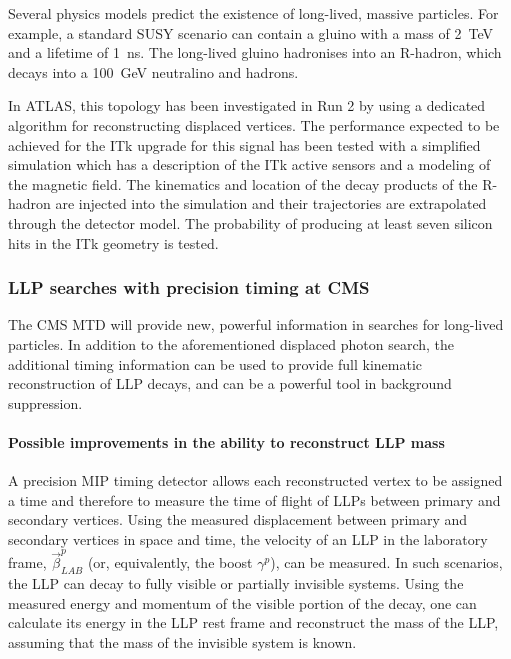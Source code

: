 Several physics models predict the existence of long-lived, massive particles. For example, a standard SUSY scenario can contain a gluino with a mass of 2~TeV and a lifetime of 1~ns. The long-lived gluino hadronises into an R-hadron, which decays into a 100~GeV neutralino and hadrons.

In ATLAS, this topology has been investigated in Run 2 by using a dedicated algorithm for reconstructing displaced vertices. The performance expected to be achieved for the ITk upgrade for this signal has been tested with a simplified simulation which has a description of the ITk active sensors and a modeling of the magnetic field. The kinematics and location of the decay products of the R-hadron are injected into the simulation and their trajectories are extrapolated through the detector model. The probability of producing at least seven silicon hits in the ITk geometry is tested.


\subsubsection{LLP searches with precision timing at CMS}


The CMS MTD will provide new, powerful information in searches for long-lived particles. In addition to the aforementioned displaced photon search, the additional timing information can be used to provide full kinematic reconstruction of LLP decays, and can be a powerful tool in background suppression.

\paragraph{Possible improvements in the ability to reconstruct LLP mass}

A precision MIP timing detector allows each reconstructed vertex to be assigned a time and therefore to measure the time of flight of LLPs between primary and secondary vertices. Using the measured displacement between primary and secondary vertices in space and time, the velocity of an LLP in the laboratory frame, $\vec{\beta}_{LAB}^{p}$ (or, equivalently, the boost $\gamma^p$), can be measured. In such scenarios, the LLP can decay to fully visible or partially invisible systems. Using the measured energy and momentum of the visible portion of the decay, one can calculate its energy in the LLP rest frame and reconstruct the mass of the LLP, assuming that the mass of the invisible system is known.

